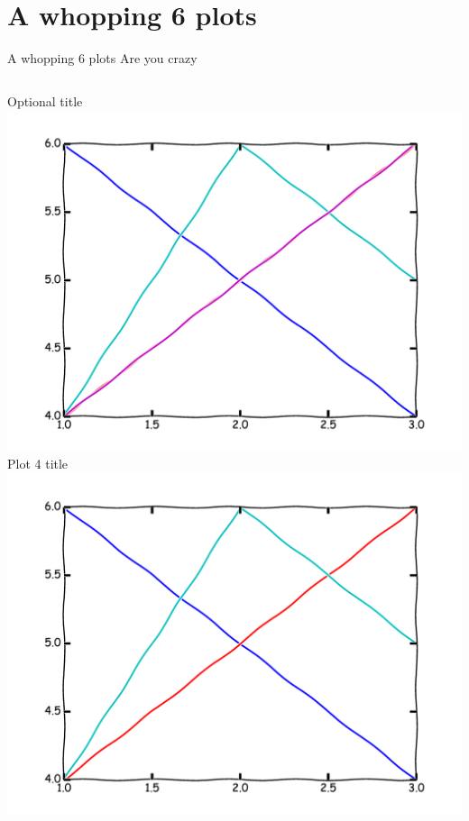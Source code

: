 \section{A whopping 6 plots}
\begin{frame}{A whopping 6 plots}
Are you crazy
\begin{columns}
\begin{column}{0.33\textwidth}
\begin{center}
Optional title
\\
\includegraphics[width=\textwidth]{example/plot1.pdf}
\\
Plot 4 title
\\
\includegraphics[width=\textwidth]{example/plot4.pdf}
\end{center}
\end{column}


\end{columns}
\end{frame}
